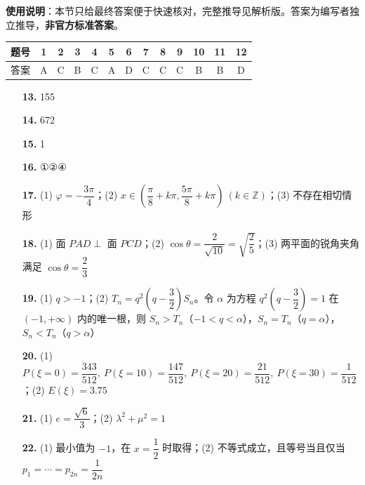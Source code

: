 
\begin{gknotice}
\textbf{使用说明}：本节只给最终答案便于快速核对，完整推导见解析版。答案为编写者独立推导，\textbf{非官方标准答案}。
\end{gknotice}

\begin{center}\begin{tabular}{ccccccccccccc}
\toprule
题号 & 1 & 2 & 3 & 4 & 5 & 6 & 7 & 8 & 9 & 10 & 11 & 12 \\
\midrule
答案 & A & C & B & C & A & D & C & C & C & B & B & D \\
\bottomrule
\end{tabular}\end{center}

\begin{itemize}[leftmargin=2.6em]
  \item[\textbf{13.}] 155
  \item[\textbf{14.}] 672
  \item[\textbf{15.}] 1
  \item[\textbf{16.}] ①②④
\end{itemize}

\begin{itemize}[leftmargin=2.6em]
  \item[\textbf{17.}] (1) $\varphi=-\dfrac{3\pi}{4}$；(2) $x\in\left(\dfrac{\pi}{8}+k\pi,\dfrac{5\pi}{8}+k\pi\right)\ (k\in\mathbb Z)$；(3) 不存在相切情形
  \item[\textbf{18.}] (1) 面 $PAD\perp$ 面 $PCD$；(2) $\cos\theta=\dfrac{2}{\sqrt{10}}=\sqrt{\dfrac25}$；(3) 两平面的锐角夹角满足 $\cos\theta=\dfrac23$
  \item[\textbf{19.}] (1) $q>-1$；(2) $T_n=q^2\left(q-\dfrac32\right)S_n$。令 $\alpha$ 为方程 $q^2(q-\dfrac32)=1$ 在 $(-1,+\infty)$ 内的唯一根，则 $S_n>T_n$（$-1<q<\alpha$），$S_n=T_n$（$q=\alpha$），$S_n<T_n$（$q>\alpha$）
  \item[\textbf{20.}] (1) $P(\xi=0)=\dfrac{343}{512},\ P(\xi=10)=\dfrac{147}{512},\ P(\xi=20)=\dfrac{21}{512},\ P(\xi=30)=\dfrac1{512}$；(2) $E(\xi)=3.75$
  \item[\textbf{21.}] (1) $e=\dfrac{\sqrt6}{3}$；(2) $\lambda^2+\mu^2=1$
  \item[\textbf{22.}] (1) 最小值为 $-1$，在 $x=\dfrac12$ 时取得；(2) 不等式成立，且等号当且仅当 $p_1=\cdots=p_{2n}=\dfrac1{2n}$
\end{itemize}
